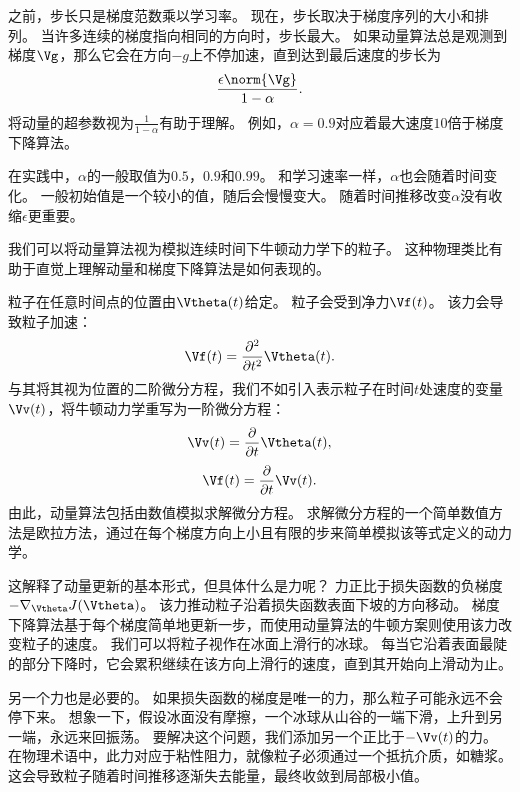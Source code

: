 
之前，步长只是梯度范数乘以学习率。
现在，步长取决于梯度序列的大小和排列。
当许多连续的梯度指向相同的方向时，步长最大。
如果动量算法总是观测到梯度$\Vg$，那么它会在方向$-g$上不停加速，直到达到最后速度的步长为
\begin{equation}
    \frac{\epsilon \norm{\Vg}}{1-\alpha} .
\end{equation}
将动量的超参数视为$\frac{1}{1-\alpha}$有助于理解。
例如，$\alpha=0.9$对应着最大速度$10$倍于梯度下降算法。


在实践中，$\alpha$的一般取值为$0.5$，$0.9$和$0.99$。
和学习速率一样，$\alpha$也会随着时间变化。 
一般初始值是一个较小的值，随后会慢慢变大。
随着时间推移改变$\alpha$没有收缩$\epsilon$更重要。

我们可以将动量算法视为模拟连续时间下牛顿动力学下的粒子。
这种物理类比有助于直觉上理解动量和梯度下降算法是如何表现的。

粒子在任意时间点的位置由$\Vtheta(t)$给定。
粒子会受到净力$\Vf(t)$。
该力会导致粒子加速：
\begin{equation}
    \Vf(t) = \frac{\partial^2}{\partial t^2} \Vtheta(t) .
\end{equation}
与其将其视为位置的二阶微分方程，我们不如引入表示粒子在时间$t$处速度的变量$\Vv(t)$，将牛顿动力学重写为一阶微分方程：
\begin{equation}
    \Vv(t) = \frac{\partial}{\partial t} \Vtheta(t) ,
\end{equation}
\begin{equation}
    \Vf(t) = \frac{\partial}{\partial t} \Vv(t) .
\end{equation}
由此，动量算法包括由数值模拟求解微分方程。
求解微分方程的一个简单数值方法是欧拉方法，通过在每个梯度方向上小且有限的步来简单模拟该等式定义的动力学。

这解释了动量更新的基本形式，但具体什么是力呢？
力正比于损失函数的负梯度$-\nabla_{\Vtheta} J(\Vtheta)$。
该力推动粒子沿着损失函数表面下坡的方向移动。
梯度下降算法基于每个梯度简单地更新一步，而使用动量算法的牛顿方案则使用该力改变粒子的速度。
我们可以将粒子视作在冰面上滑行的冰球。
每当它沿着表面最陡的部分下降时，它会累积继续在该方向上滑行的速度，直到其开始向上滑动为止。


另一个力也是必要的。
如果损失函数的梯度是唯一的力，那么粒子可能永远不会停下来。
想象一下，假设冰面没有摩擦，一个冰球从山谷的一端下滑，上升到另一端，永远来回振荡。
要解决这个问题，我们添加另一个正比于$-\Vv(t)$的力。
在物理术语中，此力对应于粘性阻力，就像粒子必须通过一个抵抗介质，如糖浆。
这会导致粒子随着时间推移逐渐失去能量，最终收敛到局部极小值。


